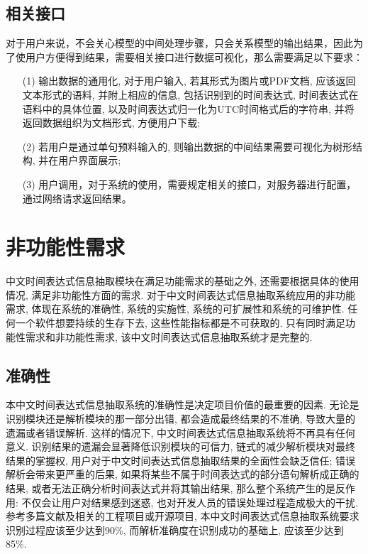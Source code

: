 \subsection{相关接口}

对于用户来说，不会关心模型的中间处理步骤，只会关系模型的输出结果，因此为了使用户方便得到结果，需要相关接口进行数据可视化，那么需要满足以下要求：
\begin{enumerate}
    \item[(1)] 输出数据的通用化, 对于用户输入, 若其形式为图片或PDF文档, 应该返回文本形式的语料, 并附上相应的信息, 包括识别到的时间表达式, 时间表达式在语料中的具体位置, 以及时间表达式归一化为UTC时间格式后的字符串, 并将返回数据组织为文档形式, 方便用户下载;
    \item[(2)] 若用户是通过单句预料输入的, 则输出数据的中间结果需要可视化为树形结构, 并在用户界面展示;
    \item[(3)]  用户调用，对于系统的使用，需要规定相关的接口，对服务器进行配置，通过网络请求返回结果。
\end{enumerate}

\section{非功能性需求}

中文时间表达式信息抽取模块在满足功能需求的基础之外, 还需要根据具体的使用情况, 满足非功能性方面的需求.
对于中文时间表达式信息抽取系统应用的非功能需求, 体现在系统的准确性, 系统的实施性, 系统的可扩展性和系统的可维护性.
任何一个软件想要持续的生存下去, 这些性能指标都是不可获取的. 只有同时满足功能性需求和非功能性需求, 该中文时间表达式信息抽取系统才是完整的.

\subsection{准确性}

本中文时间表达式信息抽取系统的准确性是决定项目价值的最重要的因素. 
无论是识别模块还是解析模块的那一部分出错, 都会造成最终结果的不准确, 导致大量的遗漏或者错误解析. 
这样的情况下, 中文时间表达式信息抽取系统将不再具有任何意义.
识别结果的遗漏会显著降低识别模块的可信力, 链式的减少解析模块对最终结果的掌握权, 用户对于中文时间表达式信息抽取结果的全面性会缺乏信任;
错误解析会带来更严重的后果, 如果将某些不属于时间表达式的部分语句解析成正确的结果, 或者无法正确分析时间表达式并将其输出结果, 那么整个系统产生的是反作用:
不仅会让用户对结果感到迷惑, 也对开发人员的错误处理过程造成极大的干扰. 
参考多篇文献及相关的工程项目或开源项目, 本中文时间表达式信息抽取系统要求识别过程应该至少达到90\%, 而解析准确度在识别成功的基础上, 应该至少达到85\%.

